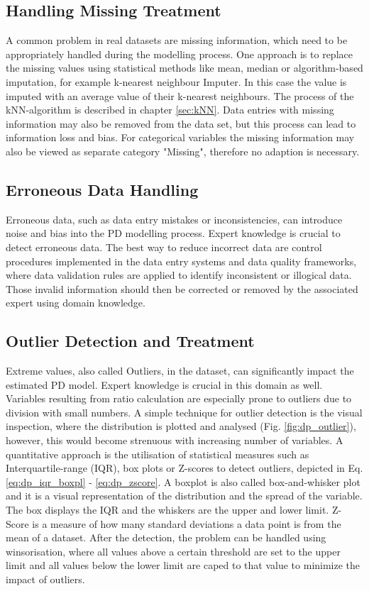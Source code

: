 \subsection{Handling Missing Treatment}
A common problem in real datasets are missing information, which need to be appropriately handled during the modelling process. One approach is to replace the missing values using statistical methods like mean, median or algorithm-based imputation, for example k-nearest neighbour Imputer. In this case the value is imputed with an average value of their k-nearest neighbours. The process of the kNN-algorithm is described in chapter \ref{sec:kNN}. Data entries with missing information may also be removed from the data set, but this process can lead to information loss and bias. For categorical variables the missing information may also be viewed as separate category "Missing", therefore no adaption is necessary. 

\subsection{Erroneous Data Handling}
Erroneous data, such as data entry mistakes or inconsistencies, can introduce noise and bias into the PD modelling process. Expert knowledge is crucial to detect erroneous data. The best way to reduce incorrect data are control procedures implemented in the data entry systems and data quality frameworks, where data validation rules are applied to identify inconsistent or illogical data. Those invalid information should then be corrected or removed by the associated expert using domain knowledge.

\subsection{Outlier Detection and Treatment}
Extreme values, also called Outliers, in the dataset, can significantly impact the estimated PD model. Expert knowledge is crucial in this domain as well. Variables resulting from ratio calculation are especially prone to outliers due to division with small numbers. A simple technique for outlier detection is the visual inspection, where the distribution is plotted and analysed (Fig. \ref{fig:dp_outlier}), however, this would become strenuous with increasing number of variables. A quantitative approach is the utilisation of statistical measures such as Interquartile-range (IQR), box plots or Z-scores to detect outliers, depicted in Eq. \ref{eq:dp_iqr_boxpl} - \ref{eq:dp_zscore}. A boxplot is also called box-and-whisker plot and it is a visual representation of the distribution and the spread of the variable. The box displays the IQR and the whiskers are the upper and lower limit. Z-Score is a measure of how many standard deviations a data point is from the mean of a dataset. After the detection, the problem can be handled using winsorisation, where all values above a certain threshold are set to the upper limit and all values below the lower limit are caped to that value to minimize the impact of outliers.

